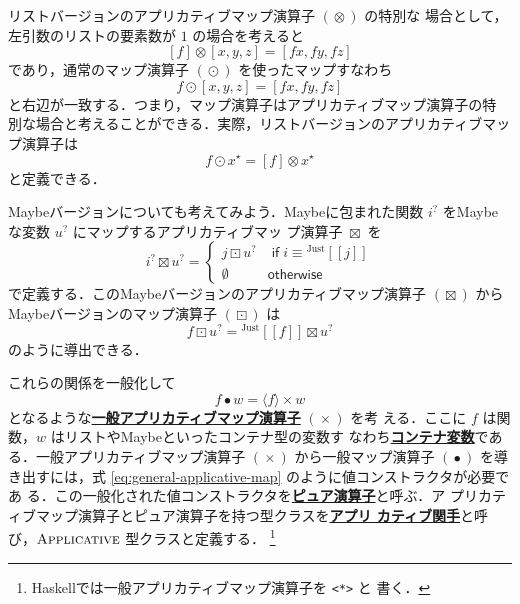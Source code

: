\documentclass[a5paper,twoside,fleqn]{jsbook}
\def\[{\left[\!\left[}
\def\]{\right]\!\right]}
\newcommand{\programminglanguage}[1]{\textsf{#1}}
\newcommand{\haskell}{\programminglanguage{Haskell}}
\newcommand{\keyword}[1]{{\underline{\textbf{#1}}}}
\newcommand{\code}[1]{\texttt{#1}}
\newcommand{\mKeyword}[1]{\mathsf{#1}} %
\newcommand{\mIfKeyword}{\mKeyword{if}}
\newcommand{\mOtherwiseKeyword}{\mKeyword{otherwise}}
\DeclareMathOperator{\mIf}{\mIfKeyword}
\DeclareMathOperator{\mOtherwise}{\mOtherwiseKeyword}
\newcommand{\mNothing}{\emptyset}
\DeclareMathOperator{\mAppMap}{\times}
\DeclareMathOperator{\mAppMapList}{\otimes}
\DeclareMathOperator{\mAppMapMaybe}{\boxtimes}
\DeclareMathOperator{\mLogicalAnd}{\wedge}
\DeclareMathOperator{\mMap}{\bullet}
\DeclareMathOperator{\mMapList}{\odot}
\DeclareMathOperator{\mMapMaybe}{\boxdot}
\newcommand{\mGenericValueConstructor}[1]{\mathrm{#1}}
\newcommand{\mGenericWith}[2]{{}^\mGenericValueConstructor{#1}\[#2\]}
\newcommand{\mJustWith}[1]{\mGenericWith{Just}{#1}}
\newcommand{\mListWith}[1]{\left[#1\right]}
\newcommand{\mPureWith}[1]{\langle#1\rangle}
\newcommand{\mGenericTypeClass}[1]{\textsc{#1}} %
\newcommand{\mApplicativeTypeClass}{\mGenericTypeClass{Applicative}}
\newcommand{\mList}[1]{{#1}^\mathrm{\star}}
\newcommand{\mMaybe}[1]{{#1}^?}
\begin{document}
リストバージョンのアプリカティブマップ演算子 $(\mAppMapList)$ の特別な
場合として，左引数のリストの要素数が $1$ の場合を考えると
\begin{equation}
\mListWith{f}\mAppMapList\mListWith{x,y,z}
=\mListWith{fx,fy,fz}
\end{equation}
であり，通常のマップ演算子 $(\mMapList)$ を使ったマップすなわち
\begin{equation}
f\mMapList\mListWith{x,y,z}
=\mListWith{fx,fy,fz}
\end{equation}
と右辺が一致する．つまり，マップ演算子はアプリカティブマップ演算子の特
別な場合と考えることができる．実際，リストバージョンのアプリカティブマッ
プ演算子は
\begin{equation}
f\mMapList\mList{x}
=\mListWith{f}\mAppMapList\mList{x}
\end{equation}
と定義できる．

Maybeバージョンについても考えてみよう．Maybeに包まれた関数
$\mMaybe{i}$ をMaybeな変数 $\mMaybe{u}$ にマップするアプリカティブマッ
プ演算子 $\mAppMapMaybe$ を
\begin{equation}
\mMaybe{i}\mAppMapMaybe\mMaybe{u}
=\begin{cases}
j\mMapMaybe\mMaybe{u}&\mIf i\equiv\mJustWith{j}\\
\mNothing&\mOtherwise
\end{cases}
\end{equation}
で定義する．このMaybeバージョンのアプリカティブマップ演算子
$(\mAppMapMaybe)$ からMaybeバージョンのマップ演算子 $(\mMapMaybe)$ は
\begin{equation}
f\mMapMaybe\mMaybe{u}
=\mJustWith{f}\mAppMapMaybe\mMaybe{u}
\end{equation}
のように導出できる．

これらの関係を一般化して
\begin{equation}
\label{eq:general-applicative-map}
f\mMap w=\mPureWith{f}\mAppMap w
\end{equation}
となるような\keyword{一般アプリカティブマップ演算子} $(\mAppMap)$ を考
える．ここに $f$ は関数，$w$ はリストやMaybeといったコンテナ型の変数す
なわち\keyword{コンテナ変数}である．一般アプリカティブマップ演算子
$(\mAppMap)$ から一般マップ演算子 $(\mMap)$ を導き出すには，式
\eqref{eq:general-applicative-map} のように値コンストラクタが必要であ
る．この一般化された値コンストラクタを\keyword{ピュア演算子}と呼ぶ．ア
プリカティブマップ演算子とピュア演算子を持つ型クラスを\keyword{アプリ
  カティブ関手}と呼び，$\mApplicativeTypeClass$ 型クラスと定義する．
\footnote{\haskell では一般アプリカティブマップ演算子を \code{<*>} と
  書く．}
\end{document}
